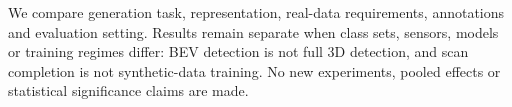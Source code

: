 
We compare generation task, representation, real-data requirements,
annotations and evaluation setting. Results remain separate when class
sets, sensors, models or training regimes differ: BEV detection is not full
3D detection, and scan completion is not synthetic-data training. No new
experiments, pooled effects or statistical significance claims are made.
